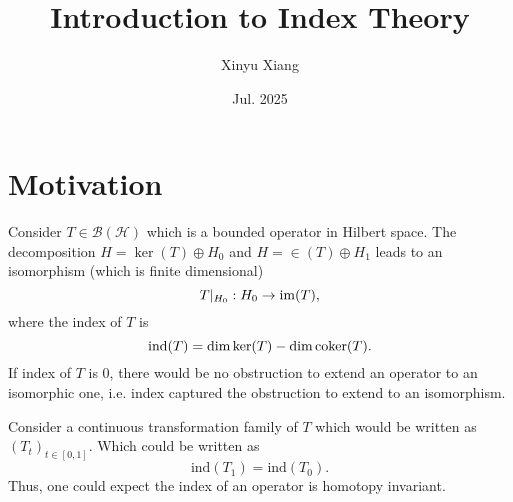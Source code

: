 \documentclass[10pt]{article}
\title{\textbf{Introduction to Index Theory}}
\author{Xinyu Xiang}
\date{Jul. 2025}
\begin{document}
\maketitle

\section{Motivation}

Consider $ T \in \mathcal{B}(\mathcal{H})$ which is a bounded operator in Hilbert space. The decomposition $ H = \ker(T) \oplus H_0$ and $ H = \in(T) \oplus H_1$ leads to an isomorphism (which is finite dimensional)
\begin{equation*}
  T |_{H_0 } : H_0 \rightarrow \operatorname{im}(T),
\end{equation*}
where the index of $ T$ is
\begin{equation*}
  \mathrm{ind}(T) = \dim \ker (T) - \dim \operatorname{coker} (T).
\end{equation*}
If index of $ T$ is $ 0 $, there would be no obstruction to extend an operator to an isomorphic one, i.e. index captured the obstruction to extend to an isomorphism.

Consider a continuous transformation family of $ T$ which would be written as $ \left( T_{t} \right)_{t \in [0,1]} $. Which could be written as
\begin{equation*}
  \mathrm{ind}(T_{1}) = \mathrm{ind}(T_0).
\end{equation*}
Thus, one could expect the index of an operator is homotopy invariant.
\end{document}
